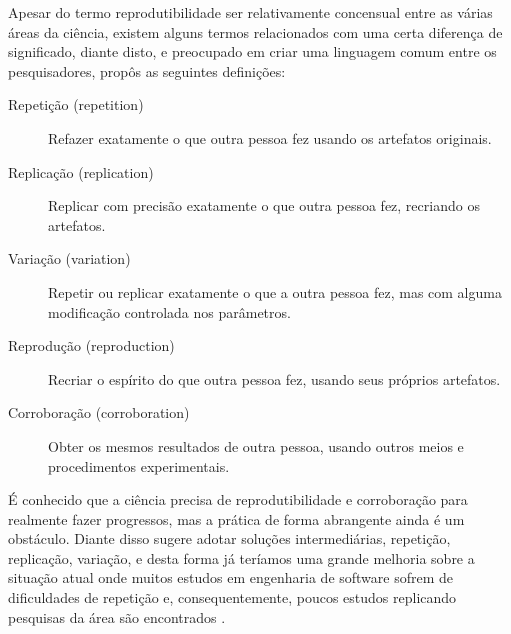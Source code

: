 %

%

Apesar do termo reprodutibilidade ser relativamente concensual entre as várias
áreas da ciência, existem alguns termos relacionados com uma certa diferença
de significado, diante disto, e preocupado em criar uma linguagem comum entre
os pesquisadores,  propôs as seguintes definições:

\begin{description}

  \item[Repetição (repetition)]
  Refazer exatamente o que outra pessoa fez usando os artefatos originais.

  \item[Replicação (replication)]
  Replicar com precisão exatamente o que outra pessoa fez, recriando os
  artefatos.

  \item[Variação (variation)]
  Repetir ou replicar exatamente o que a outra pessoa fez, mas com alguma
  modificação controlada nos parâmetros.

  \item[Reprodução (reproduction)]
  Recriar o espírito do que outra pessoa fez, usando seus próprios artefatos.

  \item[Corroboração (corroboration)]
  Obter os mesmos resultados de outra pessoa, usando outros meios e
  procedimentos experimentais.

\end{description}

É conhecido que a ciência precisa de reprodutibilidade e corroboração para
realmente fazer progressos, mas a prática de forma abrangente ainda é um
obstáculo. Diante disso  sugere adotar soluções
intermediárias, repetição, replicação, variação, e desta forma já teríamos uma
grande melhoria sobre a situação atual onde muitos estudos em engenharia de
software sofrem de dificuldades de repetição \cite{Tang2016} e,
consequentemente, poucos estudos replicando pesquisas da área são encontrados
\cite{da2011replication}.

